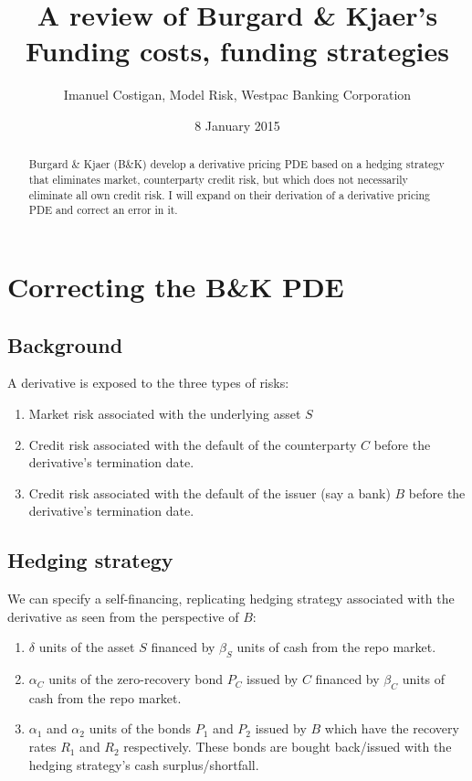 \documentclass{tufte-handout}
\title{A review of Burgard \& Kjaer's Funding costs, funding strategies}
\author{Imanuel Costigan, Model Risk, Westpac Banking Corporation}
\date{8 January 2015}  %
\begin{document}
\maketitle%

\begin{abstract}
\noindent Burgard \& Kjaer (B\&K) \cite{bkfunding2013up} develop a derivative
pricing PDE based on a hedging strategy that eliminates market, counterparty
credit risk, but which does not necessarily eliminate all own credit risk. I
will expand on their derivation of a derivative pricing PDE and correct an error
in it.
\end{abstract}

\section{Correcting the B\&K PDE}\label{sec:correction}

\subsection{Background}

A derivative is exposed to the three types of risks:

\begin{enumerate}
\item Market risk associated with the underlying asset $S$
\item Credit risk associated with the default of the counterparty $C$ before the
derivative's termination date.
\item Credit risk associated with the default of the issuer (say a bank) $B$
before the derivative's termination date.
\end{enumerate}

\subsection{Hedging strategy}\label{sec:dynhedging}

We can specify a self-financing, replicating hedging strategy associated with the
derivative as seen from the perspective of $B$:

\begin{enumerate}
\item $\delta$ units of the asset $S$ financed by $\beta_S$ units of cash
from the repo market.
\item $\alpha_C$ units of the zero-recovery bond $P_C$ issued by $C$ financed
by $\beta_C$ units of cash from the repo market.
\item $\alpha_1$ and $\alpha_2$ units of the bonds $P_1$ and $P_2$ issued
by $B$ which have the recovery rates $R_1$ and $R_2$ respectively.
These bonds are bought back/issued with the hedging strategy's cash
surplus/shortfall.
\end{enumerate}
\end{document}

